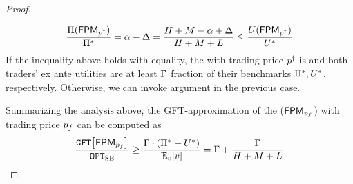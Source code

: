 \begin{proof}
\begin{itemize}
        \begin{align*}
            \frac{\Pi({\sf FPM}_{p^\dagger})}{\Pi^*} = \alpha - \Delta = \frac{H + M - \alpha + \Delta}{H + M + L}
            \leq 
            \frac{U({\sf FPM}_{p^\dagger})}{U^*}
        \end{align*}
        If the inequality above holds with equality, the {\FixPrice} with trading price $p^\dagger$ is {\ksfair} and both traders' ex ante utilities are at least $\Gamma$ fraction of their benchmarks $\Pi^*,U^*$, respectively. Otherwise, we can invoke argument in the previous case.
    \end{itemize}
    Summarizing the analysis above, the GFT-approximation of the {\ksfair} {\FixPrice} (${\sf FPM}_{p_f}$) with trading price $p_f$ can be computed as 
    \begin{align*}
        \frac{\GFT{\FPM_{\fprice}}}{\OPTSB}
        \geq
        \frac{\exanteutilratio \cdot (\sellerbenchmark + \buyerbenchmark)}{\expect[\val]{\val}}
        =
        \exanteutilratio + \frac{\exanteutilratio}{H + M + L}
    \end{align*}


\end{proof}
